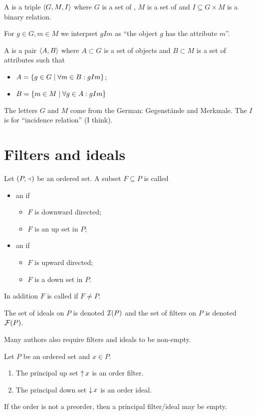 \begin{definition}
A  is a triple $\left\langle G,M,I \right\rangle$ where $G$ is a set of , $M$ is a set of  and $I\subseteq G\times M$ is a binary relation.

For $g\in G, m\in M$ we interpret $gIm$ as ``the object $g$ has the attribute $m$''.



A  is a pair $\left\langle A,B \right\rangle$ where $A\subset G$ is a set of objects and $B\subset M$ is a set of attributes such that
\begin{itemize}
\item $A = \left\{ g\in G \;\middle|\; \forall m\in B: gIm \right\}$;
\item $B = \left\{ m\in M \;\middle|\; \forall g\in A: gIm \right\}$
\end{itemize}
\end{definition}
The letters $G$ and $M$ come from the German: Gegenstände and Merkmale. The $I$ is for ``incidence relation'' (I think).

\section{Filters and ideals}
\begin{definition}
Let $\left( P,\Yleft \right)$ be an ordered set. A subset $F\subseteq P$ is called
\begin{itemize}
\item an  if
\begin{itemize}
\item $F$ is downward directed;
\item $F$ is an up set in $P$;
\end{itemize}
\item an  if
\begin{itemize}
\item $F$ is upward directed;
\item $F$ is a down set in $P$.
\end{itemize}
\end{itemize}
In addition $F$ is called  if $F \neq P$.

The set of ideals on $P$ is denoted $\operatorname{\mathcal{I}}(P)$ and the set of filters on $P$ is denoted $\operatorname{\mathcal{F}}(P)$.
\end{definition}
Many authors also require filters and ideals to be non-empty.

\begin{lemma}
Let $P$ be an ordered set and $x\in P$.
\begin{enumerate}
\item The principal up set $\operatorname{\uparrow} x$ is an order filter.
\item The principal down set $\operatorname{\downarrow} x$ is an order ideal.
\end{enumerate}
\end{lemma}
If the order is not a preorder, then a principal filter/ideal may be empty.

